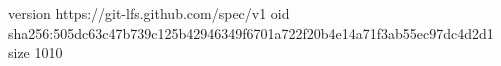 version https://git-lfs.github.com/spec/v1
oid sha256:505dc63c47b739c125b42946349f6701a722f20b4e14a71f3ab55ec97dc4d2d1
size 1010
